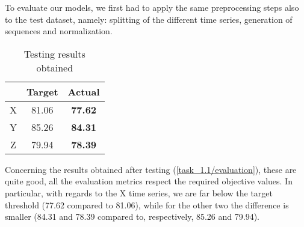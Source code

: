 \documentclass[12pt,a4paper,leqno]{article}
\begin{document}
	To evaluate our models, we first had to apply the same preprocessing steps also to the test dataset, namely: splitting of the different time series, generation of sequences and normalization.
	\begin{table}
		\centering
		\begin{tabular}{|c|c|c|}
			\hline
			& \textbf{Target} & \textbf{Actual} \\ 
			\hline
			\hline
			X & 81.06 & \textbf{77.62} \\
			Y & 85.26 & \textbf{84.31} \\
			Z & 79.94 & \textbf{78.39} \\
			\hline
		\end{tabular}
		\caption{Testing results obtained}
		\label{task_1.1/evaluation}
	\end{table}
	Concerning the results obtained after testing (\autoref{task_1.1/evaluation}), these are quite good, all the evaluation metrics respect the required objective values. In particular, with regards to the X time series, we are far below the target threshold (77.62 compared to 81.06), while for the other two the difference is smaller (84.31 and 78.39 compared to, respectively, 85.26 and 79.94).	
	
\end{document}
